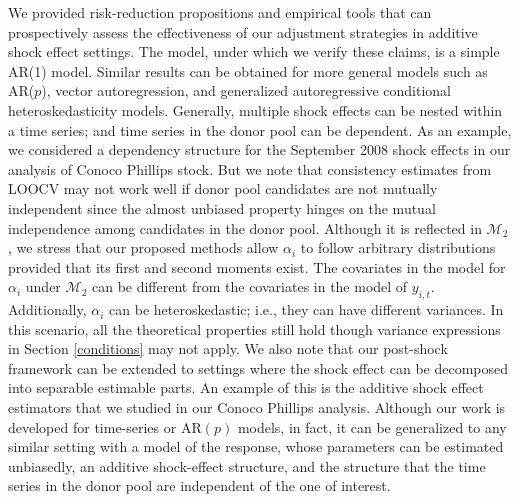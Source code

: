 \documentclass[11pt]{article}
\def\mc#1{\mathcal{#1}} %
\theoremstyle{definition}
\begin{document}
We provided risk-reduction propositions and empirical tools that can prospectively assess the effectiveness of our adjustment strategies in additive shock effect settings. The model, under which we verify these claims, is a simple AR(1) model. Similar results can be obtained for more general models such as AR($p$), vector autoregression, and generalized autoregressive conditional heteroskedasticity models. Generally, multiple shock effects can be nested within a time series; and time series in the donor pool can be dependent. As an example, we  considered a dependency structure for the September 2008 shock effects in our analysis of Conoco Phillips stock. But we note that consistency estimates from LOOCV may not work well if donor pool candidates are not mutually independent since the almost unbiased property hinges on the mutual independence among candidates in the donor pool.
Although it is reflected in $\mc{M}_2$, we stress that our proposed methods allow $\alpha_i$ to follow arbitrary distributions provided that its first and second moments exist. The covariates in the model for $\alpha_i$ under $\mc{M}_2$ can be different from the covariates in the model of $y_{i,t}$.  Additionally, $\alpha_i$ can be heteroskedastic; i.e.,  they can have different variances. In this scenario, all the theoretical properties still hold though variance expressions in Section \ref{conditions} may not apply. We also note that our post-shock framework can be extended to settings where the shock effect can be decomposed into separable estimable parts. An example of this is the additive shock effect estimators that we studied in our Conoco Phillips analysis. Although our work is developed for time-series or AR$(p)$ models, in fact, it can be generalized to any similar setting with a model of the response, whose parameters can be estimated unbiasedly, an additive shock-effect structure, and the structure that the time series in the donor pool are independent of the one of interest.
\end{document}

